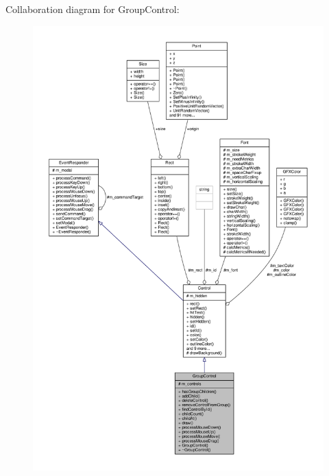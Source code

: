 Collaboration diagram for Group\+Control\+:
\nopagebreak
\begin{figure}[H]
\begin{center}
\leavevmode
\includegraphics[width=350pt]{d8/df2/classGroupControl__coll__graph}
\end{center}
\end{figure}
